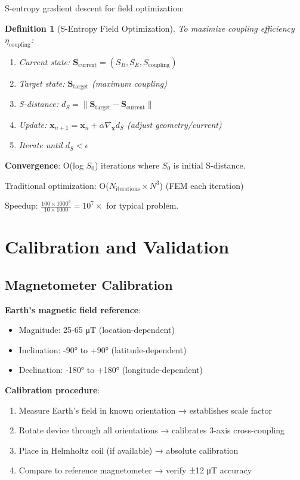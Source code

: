 \documentclass[12pt,a4paper]{article}
\newtheorem{definition}{Definition}
\begin{document}
S-entropy gradient descent for field optimization:

\begin{definition}[S-Entropy Field Optimization]
To maximize coupling efficiency $\eta_{\text{coupling}}$:
\begin{enumerate}
\item Current state: $\mathbf{S}_{\text{current}} = (S_B, S_E, S_{\text{coupling}})$
\item Target state: $\mathbf{S}_{\text{target}}$ (maximum coupling)
\item S-distance: $d_S = \|\mathbf{S}_{\text{target}} - \mathbf{S}_{\text{current}}\|$
\item Update: $\mathbf{x}_{n+1} = \mathbf{x}_n + \alpha \nabla_{\mathbf{x}} d_S$ (adjust geometry/current)
\item Iterate until $d_S < \epsilon$
\end{enumerate}
\end{definition}

\textbf{Convergence}: O(log $S_0$) iterations where $S_0$ is initial S-distance.

Traditional optimization: O($N_{\text{iterations}} \times N^3$) (FEM each iteration)

Speedup: $\frac{100 \times 1000^3}{10 \times 1000} = 10^{7}\times$ for typical problem.

\section{Calibration and Validation}

\subsection{Magnetometer Calibration}

\textbf{Earth's magnetic field reference}:
\begin{itemize}
\item Magnitude: 25-65 μT (location-dependent)
\item Inclination: -90° to +90° (latitude-dependent)
\item Declination: -180° to +180° (longitude-dependent)
\end{itemize}

\textbf{Calibration procedure}:
\begin{enumerate}
\item Measure Earth's field in known orientation → establishes scale factor
\item Rotate device through all orientations → calibrates 3-axis cross-coupling
\item Place in Helmholtz coil (if available) → absolute calibration
\item Compare to reference magnetometer → verify ±12 μT accuracy
\end{enumerate}
\end{document}
